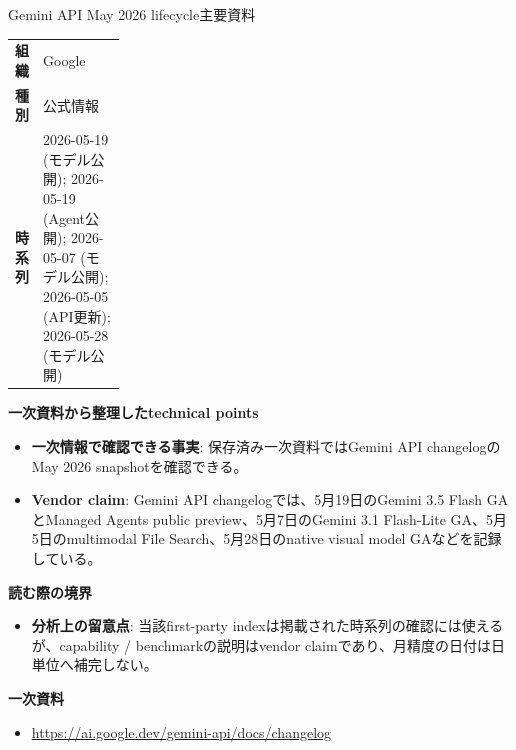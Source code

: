 \begin{technicalnote}{Gemini API May 2026 lifecycle}{主要資料}
\begingroup
\begin{tabularx}{\linewidth}{@{}>{\bfseries}p{0.22\linewidth}X@{}}
組織 & Google \\
種別 & 公式情報 \\
時系列 & 2026-05-19 (モデル公開); 2026-05-19 (Agent公開); 2026-05-07 (モデル公開); 2026-05-05 (API更新); 2026-05-28 (モデル公開) \\
\end{tabularx}
\smallskip
{\bfseries 一次資料から整理したtechnical points}
\begin{itemize}[leftmargin=1.5em,itemsep=0.35em]
\item \textbf{一次情報で確認できる事実}: 保存済み一次資料ではGemini API changelogのMay 2026 snapshotを確認できる。
\end{itemize}
\begin{minipage}{\linewidth}
\begin{itemize}[leftmargin=1.5em,itemsep=0.35em]
\item \textbf{Vendor claim}: Gemini API changelogでは、5月19日のGemini 3.5 Flash GAとManaged Agents public preview、5月7日のGemini 3.1 Flash-Lite GA、5月5日のmultimodal File Search、5月28日のnative visual model GAなどを記録している。
\end{itemize}
{\bfseries 読む際の境界}
\begin{itemize}[leftmargin=1.5em,itemsep=0.35em]
\item \textbf{分析上の留意点}: 当該first-party indexは掲載された時系列の確認には使えるが、capability / benchmarkの説明はvendor claimであり、月精度の日付は日単位へ補完しない。
\end{itemize}
\begin{samepage}
{\bfseries 一次資料}
\begingroup\sloppy
\begin{itemize}[leftmargin=1.5em,itemsep=0.25em]
\item {\scriptsize\url{https://ai.google.dev/gemini-api/docs/changelog}}
\end{itemize}
\endgroup
\end{samepage}
\end{minipage}
\endgroup
\end{technicalnote}
\medskip

